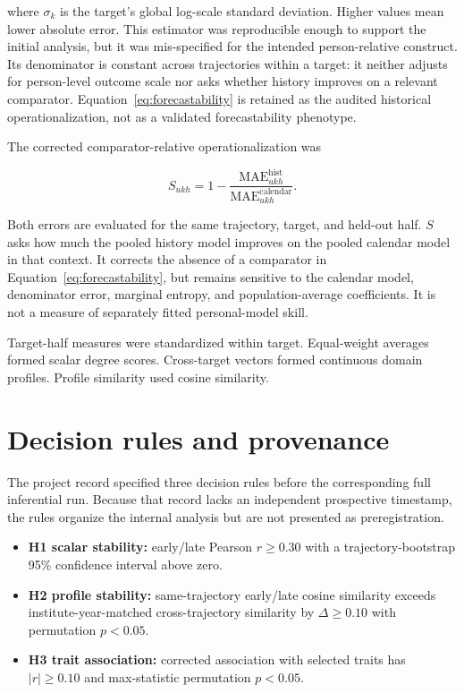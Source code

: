 \documentclass[a4paper,11pt,oneside]{report}
\begin{document}
where $\sigma_k$ is the target's global log-scale standard deviation. Higher values
mean lower absolute error. This estimator was reproducible enough to support the
initial analysis, but it was mis-specified for the intended person-relative
construct. Its denominator is constant across trajectories within a target: it
neither adjusts for person-level outcome scale nor asks whether history improves on
a relevant comparator. Equation~\ref{eq:forecastability} is retained as the audited
historical operationalization, not as a validated forecastability phenotype.

The corrected comparator-relative operationalization was

\begin{equation}
S_{ukh}=1-\frac{\mathrm{MAE}^{\mathrm{hist}}_{ukh}}
{\mathrm{MAE}^{\mathrm{calendar}}_{ukh}}.
\label{eq:skill}
\end{equation}

Both errors are evaluated for the same trajectory, target, and held-out half. $S$
asks how much the pooled history model improves on the pooled calendar model in that
context. It corrects the absence of a comparator in
Equation~\ref{eq:forecastability}, but remains sensitive to the calendar model,
denominator error, marginal entropy, and population-average coefficients. It is not
a measure of separately fitted personal-model skill.

Target-half measures were standardized within target. Equal-weight averages formed
scalar degree scores. Cross-target vectors formed continuous domain profiles.
Profile similarity used cosine similarity.

\section{Decision rules and provenance}

The project record specified three decision rules before the corresponding full
inferential run. Because that record lacks an independent prospective timestamp,
the rules organize the internal analysis but are not presented as preregistration.

\begin{itemize}
  \item \textbf{H1 scalar stability:} early/late Pearson $r\geq0.30$ with a
  trajectory-bootstrap 95\% confidence interval above zero.
  \item \textbf{H2 profile stability:} same-trajectory early/late cosine similarity
  exceeds institute-year-matched cross-trajectory similarity by $\Delta\geq0.10$
  with permutation $p<0.05$.
  \item \textbf{H3 trait association:} corrected association with selected traits
  has $|r|\geq0.10$ and max-statistic permutation $p<0.05$.
\end{itemize}
\end{document}
